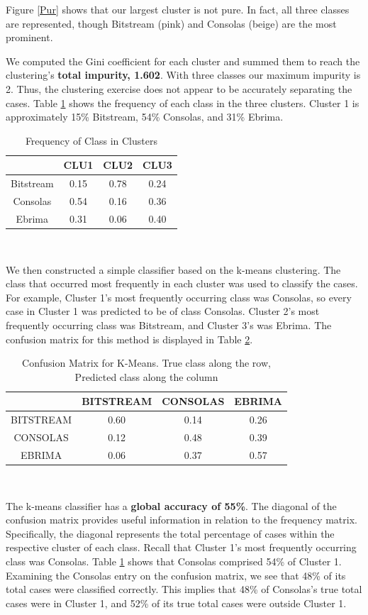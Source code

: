 \documentclass{homework}
\begin{document}
Figure \ref{Pur} shows that our largest cluster is not pure. In fact, all three classes are represented, though Bitstream (pink) and Consolas (beige) are the most prominent.

\question %
We computed the Gini coefficient for each cluster and summed them to reach the clustering's \textbf{total impurity, 1.602}. With three classes our maximum impurity is 2. Thus, the clustering exercise does not appear to be accurately separating the cases. Table \ref{Freq} shows the frequency of each class in the three clusters. Cluster 1 is approximately 15\% Bitstream, 54\% Consolas, and 31\% Ebrima.

\begin{table}[h]
    \centering
    {\begin{tabular}{c|ccc}
         &CLU1&CLU2&CLU3\\\hline
         Bitstream&0.15&0.78&0.24\\
         Consolas&0.54&0.16&0.36\\
         Ebrima&0.31&0.06&0.40
    \end{tabular}}\\
    \caption{Frequency of Class in Clusters}
    \label{Freq}
\end{table}

\question %
We then constructed a simple classifier based on the k-means clustering. The class that occurred most frequently in each cluster was used to classify the cases. For example, Cluster 1's most frequently occurring class was Consolas, so every case in Cluster 1 was predicted to be of class Consolas. Cluster 2's most frequently occurring class was Bitstream, and Cluster 3's was Ebrima. The confusion matrix for this method is displayed in Table \ref{Conf}.

\begin{table}[h]
    \centering
    {\begin{tabular}{c|ccc}
         &BITSTREAM&CONSOLAS&EBRIMA\\\hline
         BITSTREAM&0.60&0.14&0.26\\
         CONSOLAS&0.12&0.48&0.39\\
         EBRIMA&0.06&0.37&0.57
    \end{tabular}}\\
    \caption{Confusion Matrix for K-Means. True class along the row, Predicted class along the column}
    \label{Conf}
\end{table}

The k-means classifier has a \textbf{global accuracy of 55\%}. The diagonal of the confusion matrix provides useful information in relation to the frequency matrix. Specifically, the diagonal represents the total percentage of cases within the respective cluster of each class. Recall that Cluster 1's most frequently occurring class was Consolas. Table \ref{Freq} shows that Consolas comprised 54\% of Cluster 1. Examining the Consolas entry on the confusion matrix, we see that 48\% of its total cases were classified correctly. This implies that 48\% of Consolas's true total cases were in Cluster 1, and 52\% of its true total cases were outside Cluster 1.

\newpage

\end{document}
